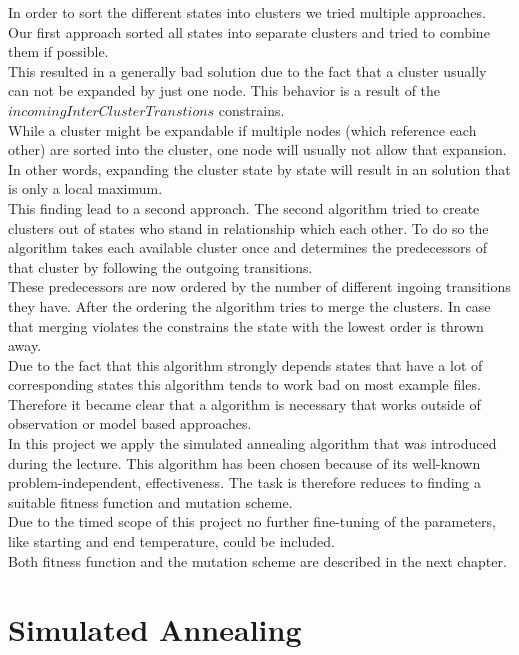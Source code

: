 In order to sort the different states into clusters we tried multiple approaches. 
Our first approach sorted all states into separate clusters and tried to combine them if possible. \\
This resulted in a generally bad solution due to the fact that a cluster usually can not be expanded by just one node. This behavior is a result of the $ incomingInterClusterTranstions $ constrains. \\
While a cluster might be expandable if multiple nodes (which reference each other) are sorted into the cluster, one node will usually not allow that expansion. \\
In other words, expanding the cluster state by state will result in an solution that is only a local maximum.\\
This finding lead to a second approach. The second algorithm tried to create clusters out of states who stand in relationship which each other. To do so the algorithm takes each available cluster once and determines the predecessors of that cluster by following the outgoing transitions. \\
These predecessors are now ordered by the number of different ingoing transitions they have. After the ordering the algorithm tries to merge the clusters. In case that merging violates the constrains the state with the lowest order is thrown away. \\
Due to the fact that this algorithm strongly depends states that have a lot of corresponding states this algorithm tends to work bad on most example files. Therefore it became clear that a algorithm is necessary that works outside of observation or model based approaches. \\


In this project we apply the simulated annealing algorithm that was introduced during the lecture. This algorithm has been chosen because of its well-known problem-independent, effectiveness. The task is therefore reduces to finding a suitable fitness function and mutation scheme.\\
Due to the timed scope of this project no further fine-tuning of the parameters, like starting and end temperature, could be included. \\
Both fitness function and the mutation scheme are described in the next chapter.\\



\chapter{Simulated Annealing}
\label{cha:SimulateAnnealing}

